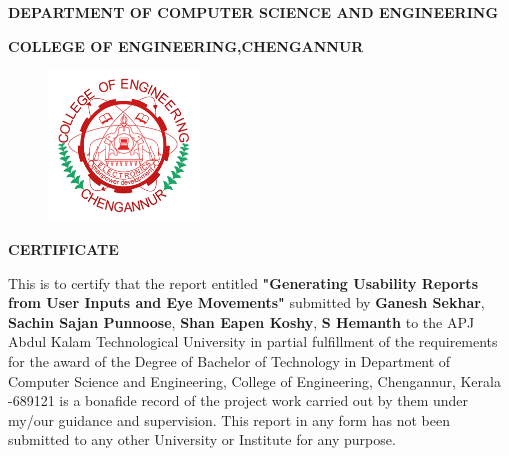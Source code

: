 \documentclass[12pt,a4paper,final]{extreport}
\begin{document}
\begin{center}\fontsize{14}{17} \selectfont \textbf{DEPARTMENT OF COMPUTER SCIENCE AND ENGINEERING}\end{center}
\begin{center}\fontsize{14}{17} \selectfont \textbf{COLLEGE OF ENGINEERING,CHENGANNUR}\end{center}
\begin{figure}[h]
	\begin{center}
		\includegraphics[width=4cm]{ceclogo.png}
		\vspace{.1 cm}
	\end{center}
\end{figure}

\begin{center}\fontsize{14}{17} \selectfont \textbf{CERTIFICATE}\end{center}
This is to certify that the report entitled \textbf{{\large "Generating Usability Reports from User Inputs and Eye Movements"}} submitted by \textbf{Ganesh Sekhar}, \textbf{Sachin Sajan Punnoose}, \textbf{Shan Eapen Koshy}, \textbf{S Hemanth} to the APJ Abdul Kalam Technological University in partial fulfillment of the requirements for the award of the Degree of Bachelor of Technology in Department of Computer Science and Engineering, College of Engineering, Chengannur, Kerala -689121 is a bonafide record of the project work carried out by them under my/our guidance and supervision. This report in any form has not been submitted to any other University or Institute for any purpose.
\end{document}
